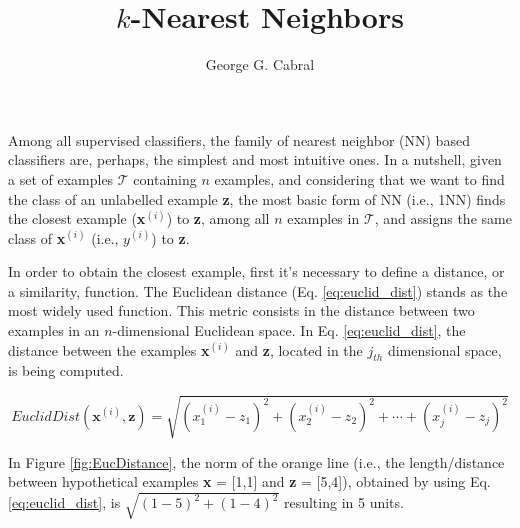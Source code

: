 \title{$k$-Nearest Neighbors}
\label{chp:k-nearest-neighbors}
\author{George G. Cabral}




\maketitle


Among all supervised classifiers, the family of nearest neighbor (NN) based classifiers are, perhaps, the simplest and most intuitive ones. In a nutshell, given a set of examples $\mathcal{T}$ containing $n$ examples, and considering that we want to find the class of an unlabelled example \textbf{z}, the most basic form of NN (i.e., 1NN) finds the closest example (\textbf{x}$^{(i)}$) to \textbf{z}, among all $n$ examples in $\mathcal{T}$, and assigns the same class of \textbf{x}$
^{(i)}$ (i.e., $y^{(i)}$) to \textbf{z}.

In order to obtain the closest example, first it's necessary to define a distance, or a similarity, function. The Euclidean distance (Eq. \ref{eq:euclid_dist}) stands as the most widely used function. This metric consists in the distance between two examples in an $n$-dimensional Euclidean space. In Eq. \ref{eq:euclid_dist}, the distance between the examples \textbf{x}$^{(i)}$ and \textbf{z}, located in the $j_{th}$ dimensional space, is being computed.

\vspace{0.2cm}

\begin{equation}
    EuclidDist(\textbf{x}^{(i)},\textbf{z}) = \sqrt{(x^{(i)}_{1} - z_1)^{2} + (x^{(i)}_{2} - z_2)^{2} + \cdots + (x^{(i)}_j - z_j)^{2}}
    \label{eq:euclid_dist}
\end{equation}

\vspace{0.2cm}

In Figure \ref{fig:EucDistance}, the norm of the orange line (i.e., the length/distance between hypothetical examples \textbf{x} = [1,1] and \textbf{z} = [5,4]), obtained by using Eq. \ref{eq:euclid_dist}, is $\sqrt{(1-5)^2 + (1-4)^2}$ resulting in 5 units. 


